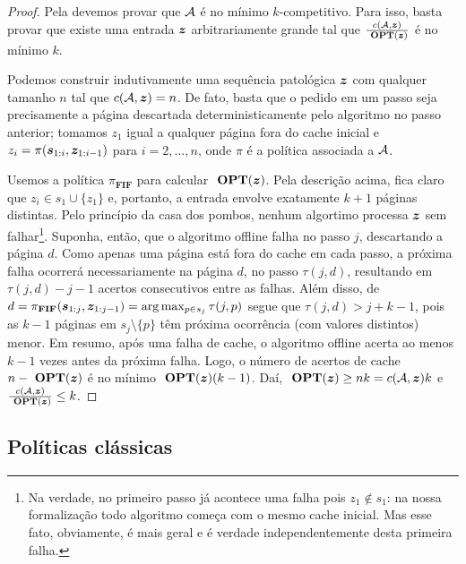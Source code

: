 \begin{proof}

  Pela  devemos provar que \(\mathcal{A}\) é no mínimo \(k\)-competitivo. Para isso, basta provar que existe uma entrada \(\bm{z}\) arbitrariamente grande tal que \(\frac{c(\mathcal{A},\bm{z})} {\ \textbf{OPT}(\bm{z})}\) é no mínimo \(k\). 

  Podemos construir indutivamente uma sequência patológica \(\bm{z}\) com qualquer tamanho \(n\) tal que \(c(\mathcal{A}, \bm{z}) = n\). De fato, basta que o pedido em um passo seja precisamente a página descartada deterministicamente pelo algoritmo no passo anterior; tomamos \(z_1\) igual a qualquer página fora do cache inicial e \(z_i = \pi(\bm{s}_{1:i}, \bm{z}_{1:i-1})\) para \(i = 2, \dotsc, n\), onde \(\pi\) é a política associada a \(\mathcal{A}\).

  Usemos a política \(\pi_{\mathbf{FIF}}\) para calcular \(\ \textbf{OPT}(\bm{z})\). Pela descrição acima, fica claro que \(z_i \in s_1 \cup \{z_1\}\) e, portanto, a entrada envolve exatamente \(k+1\) páginas distintas. Pelo princípio da casa dos pombos, nenhum algortimo processa \(\bm{z}\) sem falhar\footnote{Na verdade, no primeiro passo já acontece uma falha pois \(z_1 \notin s_1\): na nossa formalização todo algoritmo começa com o mesmo cache inicial. Mas esse fato, obviamente, é mais geral e é verdade independentemente desta primeira falha.}. Suponha, então, que o algoritmo offline falha no passo \(j\), descartando a página \(d\). Como apenas uma página está fora do cache em cada passo, a próxima falha ocorrerá necessariamente na página \(d\), no passo \(\tau(j,d)\), resultando em \(\tau(j,d) - j - 1\) acertos consecutivos entre as falhas. Além disso, de \(d = \pi_{\mathbf{FIF}}(\bm{s}_{1:j}, \bm{z}_{1:j-1}) = \arg\max_{p \in s_j} \tau(j, p)\) segue que \(\tau(j, d) > j + k - 1\), pois as \(k - 1\) páginas em \(s_j \setminus \{p\}\) têm próxima ocorrência (com valores distintos) menor. Em resumo, após uma falha de cache, o algoritmo offline acerta ao menos \(k-1\) vezes antes da próxima falha. Logo, o número de acertos de cache \(n-\ \textbf{OPT}(\bm{z})\) é no mínimo \(\ \textbf{OPT}(\bm{z})(k-1)\). Daí, \(\ \textbf{OPT}(\bm{z}) \ge nk = c(\mathcal{A},\bm{z})k\) e \(\frac{c(\mathcal{A},\bm{z})}{\ \textbf{OPT}(\bm{z})} \le k\).

\end{proof}

\subsection{Políticas clássicas}

